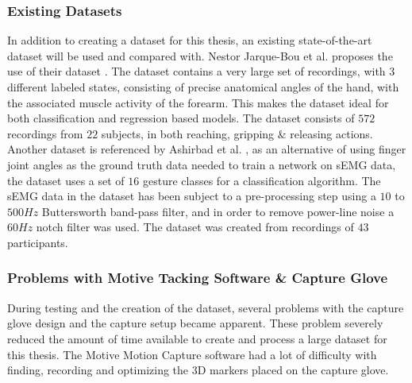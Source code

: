 \documentclass[../main.tex]{subfiles}
\begin{document}
\subsubsection{Existing Datasets}

In addition to creating a dataset for this thesis, an existing state-of-the-art dataset will be used and compared with.
Nestor Jarque-Bou et al. \cite{jarque2019} proposes the use of their dataset \cite{kinmusdataset}.
The dataset contains a very large set of recordings, with 3 different labeled states, consisting of precise anatomical angles of the hand, with the associated muscle activity of the forearm.
This makes the dataset ideal for both classification and regression based models.
The dataset consists of $572$ recordings from $22$ subjects, in both reaching, gripping \& releasing actions.
Another dataset is referenced by Ashirbad et al. \cite{ashirbad2022}, as an alternative of using finger joint angles as the ground truth data needed to train a network on sEMG data, the dataset uses a set of $16$ gesture classes for a classification algorithm.
The sEMG data in the dataset has been subject to a pre-processing step using a $10$ to $500Hz$ Buttersworth band-pass filter, and in order to remove power-line noise a $60Hz$ notch filter was used.
The dataset was created from recordings of $43$ participants.


\subsubsection{Problems with Motive Tacking Software \& Capture Glove}
\label{sec:motiveproblems}

During testing and the creation of the dataset, several problems with the capture glove design and the capture setup became apparent.
These problem severely reduced the amount of time available to create and process a large dataset for this thesis.
The Motive Motion Capture software \cite{motive} had a lot of difficulty with finding, recording and optimizing the 3D markers placed on the capture glove.
\end{document}
